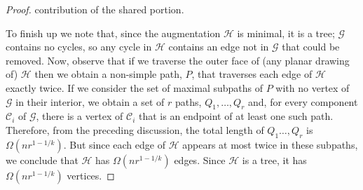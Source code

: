 \documentclass[a4paper, 11pt]{article}
\begin{document}
\begin{proof}
contribution of the shared portion.

To finish up we note that, since the augmentation $\mathcal{H}$ is minimal,
it is a tree; $\mathcal G$ contains no cycles, so any cycle in $\mathcal H$ contains an edge not in $\mathcal G$ that could be removed.  Now, observe that if we traverse the outer face of (any planar drawing of) $\mathcal H$ then we obtain a non-simple path, $P$, that traverses each edge of $\mathcal{H}$ exactly twice. If we consider the set of maximal subpaths of $P$ with no vertex of $\mathcal G$ in their interior, we obtain a set of $r$ paths, $Q_1,\ldots,Q_{r}$ and, for every component $\mathcal C_i$ of $\mathcal G$, there is a vertex of $\mathcal C_i$ that is an endpoint of at least one such path.  Therefore, from the preceding discussion, the total length of $Q_1\ldots,Q_{r}$ is $\Omega(nr^{1-1/k})$.  But since each edge of $\mathcal H$ appears at most twice in these subpaths, we conclude that $\mathcal H$ has $\Omega(nr^{1-1/k})$ edges.  Since $\mathcal H$ is a tree, it has $\Omega(nr^{1-1/k})$ vertices.
\end{proof}




\end{document}
